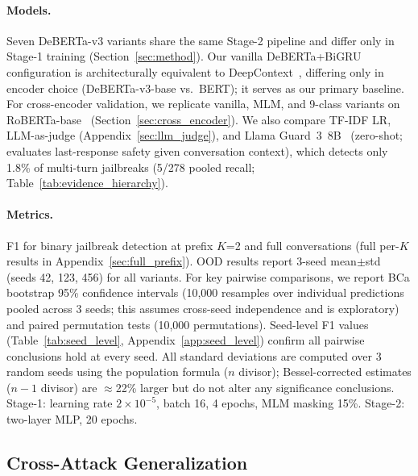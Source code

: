 \paragraph{Models.}
Seven DeBERTa-v3 variants share the same Stage-2 pipeline and differ only in Stage-1 training (Section~\ref{sec:method}).
Our vanilla DeBERTa+BiGRU configuration is architecturally equivalent to DeepContext~\citep{deepcontext2026}, differing only in encoder choice (DeBERTa-v3-base vs.\ BERT); it serves as our primary baseline.
For cross-encoder validation, we replicate vanilla, MLM, and 9-class variants on RoBERTa-base~\citep{liu2019roberta} (Section~\ref{sec:cross_encoder}).
We also compare TF-IDF LR, LLM-as-judge (Appendix~\ref{sec:llm_judge}), and Llama Guard~3~8B~\citep{metallamaguard3_2024} (zero-shot; evaluates last-response safety given conversation context), which detects only 1.8\% of multi-turn jailbreaks (5/278 pooled recall; Table~\ref{tab:evidence_hierarchy}).

\paragraph{Metrics.}
F1 for binary jailbreak detection at prefix $K$=2 and full conversations (full per-$K$ results in Appendix~\ref{sec:full_prefix}).
OOD results report 3-seed mean$\pm$std (seeds 42, 123, 456) for all variants.
For key pairwise comparisons, we report BCa bootstrap 95\% confidence intervals (10,000 resamples over individual predictions pooled across 3 seeds; this assumes cross-seed independence and is exploratory) and paired permutation tests (10,000 permutations). Seed-level F1 values (Table~\ref{tab:seed_level}, Appendix~\ref{app:seed_level}) confirm all pairwise conclusions hold at every seed.
All standard deviations are computed over 3 random seeds using the population formula ($n$ divisor); Bessel-corrected estimates ($n{-}1$ divisor) are $\approx$22\% larger but do not alter any significance conclusions.
Stage-1: learning rate $2 \times 10^{-5}$, batch 16, 4 epochs, MLM masking 15\%.
Stage-2: two-layer MLP, 20 epochs.

\subsection{Cross-Attack Generalization}

